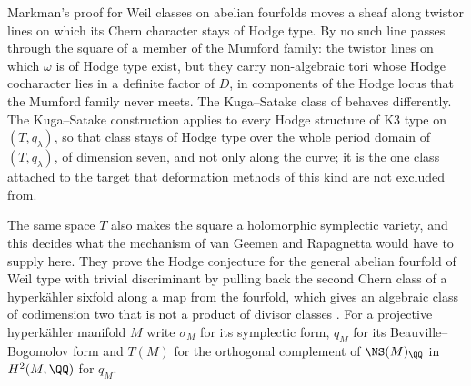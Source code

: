 Markman's proof for Weil classes on abelian fourfolds moves a sheaf along
twistor lines on which its Chern character stays of Hodge type. By
 no such line passes through the square of a member of
the Mumford family: the twistor lines on which $\omega$ is of Hodge type exist,
but they carry non-algebraic tori whose Hodge cocharacter lies in a definite
factor of $D$, in components of the Hodge locus that the Mumford family never
meets. The Kuga--Satake class of  behaves differently. The
Kuga--Satake construction applies to every Hodge structure of K3 type on
$(T,q_{\lambda})$, so that class stays of Hodge type over the whole period
domain of $(T,q_{\lambda})$, of dimension seven, and not only along the curve;
it is the one class attached to the target that deformation methods of this
kind are not excluded from.

The same space $T$ also makes the square a holomorphic symplectic variety,
and this decides what the mechanism of van Geemen and Rapagnetta would have
to supply here. They prove the Hodge conjecture for the general abelian
fourfold of Weil type with trivial discriminant by pulling back the second
Chern class of a hyperk\"ahler sixfold along a map from the fourfold, which
gives an algebraic class of codimension two that is not a product of divisor
classes \cite{vGR26}. For a projective hyperk\"ahler manifold $M$ write
$\sigma_{M}$ for its symplectic form, $q_{M}$ for its Beauville--Bogomolov
form and $T(M)$ for the orthogonal complement of $\NS(M)_{\QQ}$ in
$H^{2}(M,\QQ)$ for $q_{M}$.

